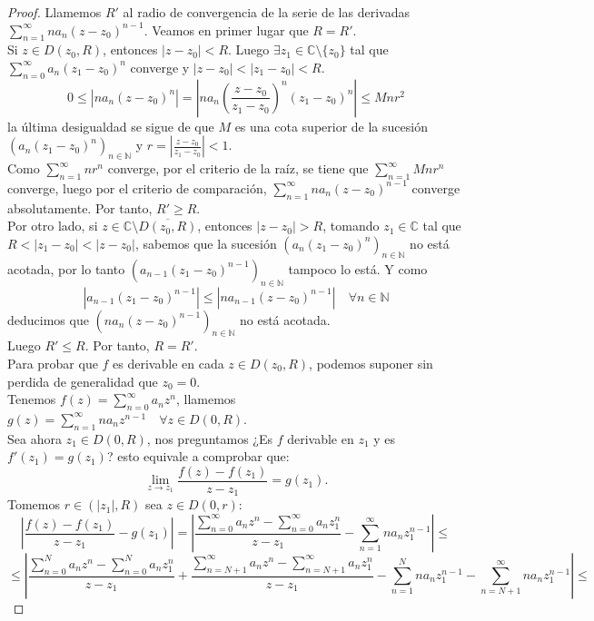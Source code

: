 \begin{proof}
    Llamemos $R'$ al radio de convergencia de la serie de las derivadas $\sum_{n=1}^{\infty} n a_n (z - z_0)^{n-1}$. Veamos en primer lugar que $R=R'$.\\
    Si $z \in D(z_0, R)$, entonces $|z-z_0| < R$. Luego $\exists z_1 \in \mathbb{C} \setminus \{z_0\}$ tal que $\sum_{n=0}^{\infty} a_n (z_1 - z_0)^n$ converge y $|z-z_0| < |z_1 - z_0| < R$. 
    \[
        0 \leq |n a_n (z - z_0)^{n}| = |n a_n \left(\frac{z - z_0}{z_1 - z_0}\right)^n (z_1 - z_0)^n| \leq M n r^2
    \]
    la última desigualdad se sigue de que $M$ es una cota superior de la sucesión $(a_n (z_1 - z_0)^n)_{n\in\mathbb{N}}$ y $r = \left|\frac{z - z_0}{z_1 - z_0}\right| < 1$.\\
    Como $\sum_{n=1}^{\infty} n r^n$ converge, por el criterio de la raíz, se tiene que $\sum_{n=1}^{\infty} M n r^n$ converge, luego por el criterio de comparación, $\sum_{n=1}^{\infty} n a_n (z - z_0)^{n-1}$ converge absolutamente. Por tanto, $R' \geq R$.\\
    Por otro lado, si $z \in \mathbb{C} \setminus \overline{D(z_0, R)}$, entonces $|z - z_0| > R$, tomando $z_1 \in \mathbb{C}$ tal que $R < |z_1 - z_0| < |z - z_0|$, sabemos que la sucesión $(a_n (z_1 - z_0)^n)_{n\in\mathbb{N}}$ no está acotada, por lo tanto $(a_{n-1} (z_1 - z_0)^{n-1})_{n\in\mathbb{N}}$ tampoco lo está. Y como
    \[
        |a_{n-1} (z_1 - z_0)^{n-1}| \leq |n a_{n-1} (z - z_0)^{n-1}| \quad \forall n \in \mathbb{N}
    \]
    deducimos que $(n a_n (z - z_0)^{n-1})_{n\in\mathbb{N}}$ no está acotada.\\
    Luego $R' \leq R$. Por tanto, $R = R'$.\\
    Para probar que $f$ es derivable en cada $z \in D(z_0, R)$, podemos suponer sin perdida de generalidad que $z_0 = 0$.\\
    Tenemos $f(z) = \sum_{n=0}^{\infty} a_n z^n$, llamemos $g(z) = \sum_{n=1}^{\infty} n a_n z^{n-1} \quad \forall z \in D(0, R)$.\\
    Sea ahora $z_1 \in D(0, R)$, nos preguntamos ¿Es $f$ derivable en $z_1$ y es $f'(z_1) = g(z_1)$? esto equivale a comprobar que:
    \[
        \lim_{z\to z_1} \frac{f(z) - f(z_1)}{z - z_1} = g(z_1).
    \]
    Tomemos $r \in \left(|z_1|, R\right)$ sea $z \in D(0, r)$:
    \[
        \left| \frac{f(z) - f(z_1)}{z - z_1} - g(z_1) \right| = \left| \frac{\sum_{n=0}^{\infty} a_n z^n - \sum_{n=0}^{\infty} a_n z_1^n}{z - z_1} - \sum_{n=1}^{\infty} n a_n z_1^{n-1} \right| \leq
    \]
    \[
        \leq \left| \frac{\sum_{n=0}^{N} a_n z^n - \sum_{n=0}^{N} a_n z_1^n}{z - z_1} + \frac{\sum_{n=N+1}^{\infty} a_n z^n - \sum_{n=N+1}^{\infty} a_n z_1^n}{z - z_1} - \sum_{n=1}^{N} n a_n z_1^{n-1} - \sum_{n=N+1}^{\infty} n a_n z_1^{n-1} \right| \leq
\]
\end{proof}
